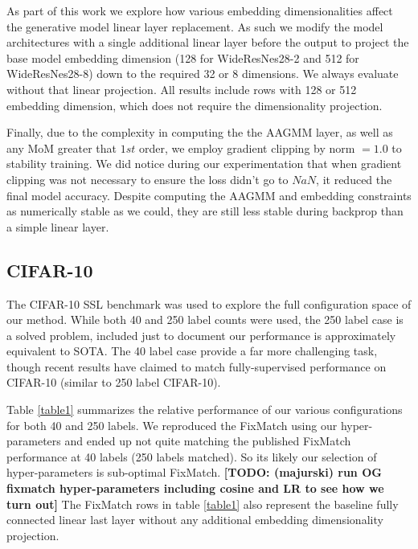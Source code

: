 \documentclass[10pt,twocolumn,letterpaper]{article}
\newcommand{\TODO}[1]{\textbf{\color{red}[TODO: #1]}}
\begin{document}
As part of this work we explore how various embedding dimensionalities affect the generative model linear layer replacement.
As such we modify the model architectures with a single additional linear layer before the output to project the base model embedding dimension (128 for WideResNes28-2 and 512 for WideResNes28-8) down to the required 32 or 8 dimensions.
We always evaluate without that linear projection.
All results include rows with 128 or 512 embedding dimension, which does not require the dimensionality projection.

Finally, due to the complexity in computing the the AAGMM layer, as well as any MoM greater that $1st$ order, we employ gradient clipping by norm $=1.0$ to stability training. 
We did notice during our experimentation that when gradient clipping was not necessary to ensure the loss didn't go to $NaN$, it reduced the final model accuracy.
Despite computing the AAGMM and embedding constraints as numerically stable as we could, they are still less stable during backprop than a simple linear layer.



\subsection{CIFAR-10}

The CIFAR-10 SSL benchmark was used to explore the full configuration space of our method.
While both 40 and 250 label counts were used, the 250 label case is a solved problem, included just to document our performance is approximately equivalent to SOTA. 
The 40 label case provide a far more challenging task, though recent results have claimed to match fully-supervised performance on CIFAR-10 (similar to 250 label CIFAR-10).

Table \ref{table1} summarizes the relative performance of our various configurations for both 40 and 250 labels.
We reproduced the FixMatch \cite{sohn2020fixmatch} using our hyper-parameters and ended up not quite matching the published FixMatch performance at 40 labels (250 labels matched). 
So its likely our selection of hyper-parameters is sub-optimal FixMatch.
\TODO {(majurski) run OG fixmatch hyper-parameters including cosine and LR to see how we turn out}
The FixMatch rows in table \ref{table1} also represent the baseline fully connected linear last layer without any additional embedding dimensionality projection.
\end{document}
